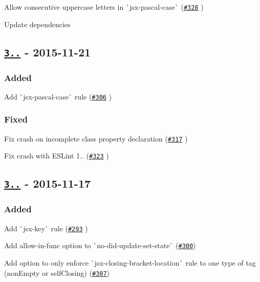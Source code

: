 \begin{DoxyItemize}
\item Allow consecutive uppercase letters in \`{}jsx-\/pascal-\/case\`{} (\href{https://github.com/yannickcr/eslint-plugin-react/issues/328}{\tt \#328} )
\item Update dependencies
\end{DoxyItemize}

\subsection*{\href{https://github.com/yannickcr/eslint-plugin-react/compare/v3.9.0...v3.10.0}{\tt 3..} -\/ 2015-\/11-\/21}

\subsubsection*{Added}


\begin{DoxyItemize}
\item Add \`{}jsx-\/pascal-\/case\`{} rule (\href{https://github.com/yannickcr/eslint-plugin-react/pull/306}{\tt \#306} )
\end{DoxyItemize}

\subsubsection*{Fixed}


\begin{DoxyItemize}
\item Fix crash on incomplete class property declaration (\href{https://github.com/yannickcr/eslint-plugin-react/issues/317}{\tt \#317} )
\item Fix crash with E\+S\+Lint 1.. (\href{https://github.com/yannickcr/eslint-plugin-react/issues/323}{\tt \#323} )
\end{DoxyItemize}

\subsection*{\href{https://github.com/yannickcr/eslint-plugin-react/compare/v3.8.0...v3.9.0}{\tt 3..} -\/ 2015-\/11-\/17}

\subsubsection*{Added}


\begin{DoxyItemize}
\item Add \`{}jsx-\/key\`{} rule (\href{https://github.com/yannickcr/eslint-plugin-react/pull/293}{\tt \#293} )
\item Add {\ttfamily allow-\/in-\/func} option to \`{}no-\/did-\/update-\/set-\/state\`{} (\href{https://github.com/yannickcr/eslint-plugin-react/issues/300}{\tt \#300})
\item Add option to only enforce \`{}jsx-\/closing-\/bracket-\/location\`{} rule to one type of tag (non\+Empty or self\+Closing) (\href{https://github.com/yannickcr/eslint-plugin-react/issues/307}{\tt \#307})
\end{DoxyItemize}

